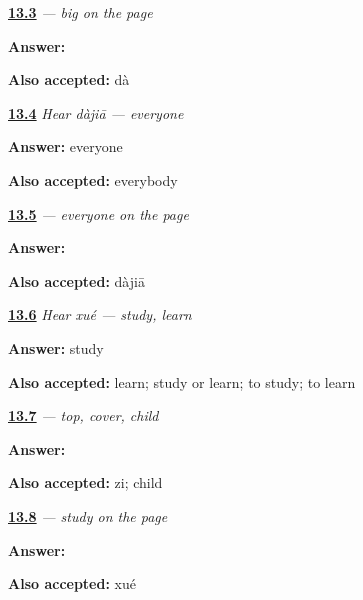 \noindent\begin{minipage}[t]{\linewidth}
\raggedright
\hyperlink{review-ZH-C13-da-write}{\textbf{13.3}} \emph{ — big on the page}\par
\small \textbf{Answer:} \par
\footnotesize \textbf{Also accepted:}  dà
\end{minipage}\par\medskip

\noindent\begin{minipage}[t]{\linewidth}
\raggedright
\hyperlink{review-ZH-C13-hear-dajia-meaning}{\textbf{13.4}} \emph{Hear \emph{dàjiā} — everyone}\par
\small \textbf{Answer:} everyone\par
\footnotesize \textbf{Also accepted:} everybody
\end{minipage}\par\medskip

\noindent\begin{minipage}[t]{\linewidth}
\raggedright
\hyperlink{review-ZH-C13-dajia-write}{\textbf{13.5}} \emph{ — everyone on the page}\par
\small \textbf{Answer:} \par
\footnotesize \textbf{Also accepted:}  dàjiā
\end{minipage}\par\medskip

\noindent\begin{minipage}[t]{\linewidth}
\raggedright
\hyperlink{review-ZH-C13-hear-xue-meaning}{\textbf{13.6}} \emph{Hear \emph{xué} — study, learn}\par
\small \textbf{Answer:} study\par
\footnotesize \textbf{Also accepted:} learn; study or learn; to study; to learn
\end{minipage}\par\medskip

\noindent\begin{minipage}[t]{\linewidth}
\raggedright
\hyperlink{review-ZH-W13-xue-build}{\textbf{13.7}} \emph{ — top, cover, child}\par
\small \textbf{Answer:} \par
\footnotesize \textbf{Also accepted:}  zi; child 
\end{minipage}\par\medskip

\noindent\begin{minipage}[t]{\linewidth}
\raggedright
\hyperlink{review-ZH-C13-xue-write}{\textbf{13.8}} \emph{ — study on the page}\par
\small \textbf{Answer:} \par
\footnotesize \textbf{Also accepted:}  xué
\end{minipage}\par\medskip

